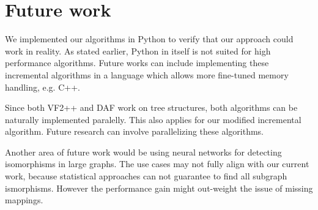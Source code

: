 \chapter{Future work}

We implemented our algorithms in Python to verify that our approach could work in reality. As stated earlier,
Python in itself is not suited for high performance algorithms. Future works can include implementing these
incremental algorithms in a language which allows more fine-tuned memory handling, e.g. C++.

Since both VF2++ and DAF work on tree structures, both algorithms can be naturally implemented paralelly. This
also applies for our modified incremental algorithm. Future research can involve parallelizing these algorithms.

Another area of future work would be using neural networks for detecting isomorphisms in large graphs. The use 
cases may not fully align with our current work, because statistical approaches can not guarantee to find all
subgraph ismorphisms. However the performance gain might out-weight the issue of missing mappings.